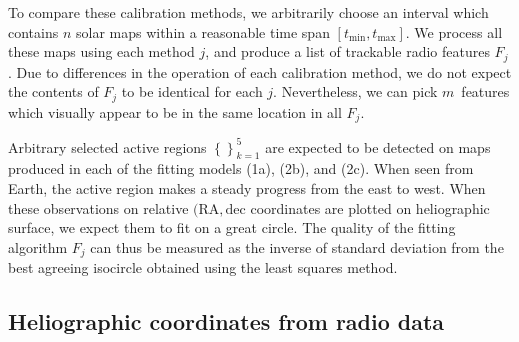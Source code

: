 \documentclass{aa}
\newcommand{\s}[2]{{#1}_{\mathrm{#2}}}
\begin{document}
  To compare these calibration methods, we arbitrarily choose an interval which contains $n$ solar maps within a 
  reasonable time span $[\s{t}{min},\s{t}{max}]$. We process all these maps using each method $j$, and produce a list of 
  trackable radio features $F_j$. Due to differences in the operation of each calibration method, we do not expect the 
  contents of $F_j$ to be identical for each $j$. Nevertheless, we can pick $m$ features which visually appear to be in 
  the same location in all $F_j$.
  
  Arbitrary selected active regions $\left\{ \right\}_{k=1}^{5}$ are expected to be detected on maps produced in each of 
  the fitting models (1a), (2b), and (2c). When seen from Earth, the active region makes a steady progress from 
  the east 
  to west. When these observations on relative $(\mathrm{RA}, \mathrm{dec}$ coordinates are plotted on heliographic 
  surface, we expect them to fit on a great
  circle. The quality of the fitting algorithm $F_j$ can thus be measured as the 
  inverse of standard deviation from the best agreeing isocircle obtained using the 
  least squares method.
\subsection{Heliographic coordinates from radio data}
\end{document}
